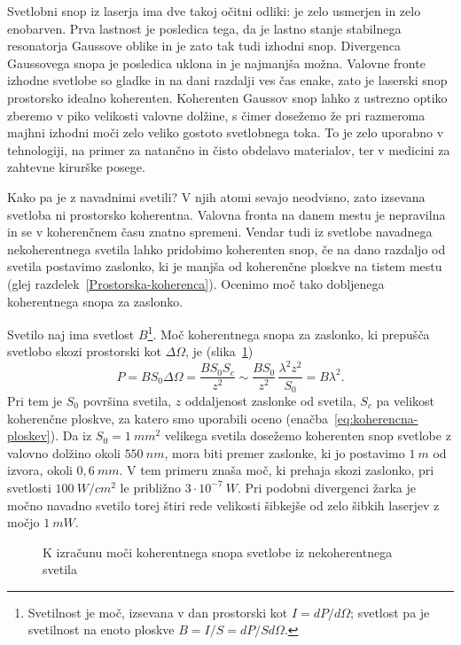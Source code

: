 Svetlobni snop iz laserja ima dve takoj očitni odliki: je zelo
usmerjen in zelo enobarven. Prva lastnost je posledica tega, da je
lastno stanje stabilnega resonatorja Gaussove oblike in je zato tak tudi
izhodni snop. Divergenca Gaussovega snopa je posledica uklona in je 
najmanjša možna. Valovne fronte izhodne svetlobe so gladke in na dani razdalji ves 
čas enake, zato je laserski snop prostorsko idealno koherenten. 
Koherenten Gaussov snop lahko z ustrezno optiko zberemo v piko velikosti
valovne dolžine, s čimer dosežemo že pri razmeroma majhni izhodni moči zelo veliko
gostoto svetlobnega toka. To je zelo uporabno v tehnologiji, na primer za natančno in
čisto obdelavo materialov, ter v medicini za
zahtevne kirurške posege.

Kako pa je z navadnimi svetili? V njih atomi sevajo neodvisno, zato
izsevana svetloba ni prostorsko koherentna. Valovna fronta na danem 
mestu je nepravilna in se v koherenčnem času znatno spremeni. 
Vendar tudi iz svetlobe navadnega nekoherentnega svetila lahko pridobimo
koherenten snop, če na dano razdaljo od svetila postavimo zaslonko, ki
je manjša od koherenčne ploskve na tistem mestu (glej 
razdelek~\ref{Prostorska-koherenca}). Ocenimo moč tako dobljenega
koherentnega snopa za zaslonko.

Svetilo naj ima svetlost $B$\footnote{Svetilnost je moč, izsevana v dan 
prostorski kot $I = dP/d\Omega$; svetlost pa je svetilnost na enoto ploskve
$B=I/S = dP/Sd\Omega$.}.  
Moč koherentnega snopa za zaslonko, ki prepušča svetlobo skozi prostorski kot 
$\Delta\Omega$, je (slika~\ref{fig:svetlost})
\begin{equation}
P=BS_{0}\Delta \Omega =\frac{BS_{0}S_{c}}{z^{2}}\sim \frac{BS_{0}}{z^{2}}\,
\frac{\lambda ^{2}z^{2}}{S_{0}}=B\lambda ^{2}.
\label{5.21}
\end{equation}
Pri tem je $S_{0}$ površina svetila, $z$ oddaljenost zaslonke od svetila, 
$S_{c}$ pa velikost koherenčne ploskve, za katero smo uporabili oceno 
(enačba~\ref{eq:koherencna-ploskev}). Da iz $S_0=1~\si{mm}^2$ velikega svetila 
dosežemo koherenten snop svetlobe z valovno dolžino okoli $550~\si{nm}$, 
mora biti premer zaslonke, ki jo postavimo $1~\si{m}$ od izvora, 
okoli $0,6~\si{mm}$. V tem primeru znaša 
moč, ki prehaja skozi zaslonko, pri svetlosti $100~\si{W/cm^{2}}$ 
le približno $3\cdot10^{-7}~\si{W}$.
Pri podobni divergenci žarka je močno navadno svetilo torej štiri rede
velikosti šibkejše od zelo šibkih laserjev z močjo $1~\si{mW}$. 
\begin{figure}[h]
\centering
\def\svgwidth{100truemm} 

\caption{K izračunu moči koherentnega snopa svetlobe iz nekoherentnega svetila}
\label{fig:svetlost}
\end{figure}

